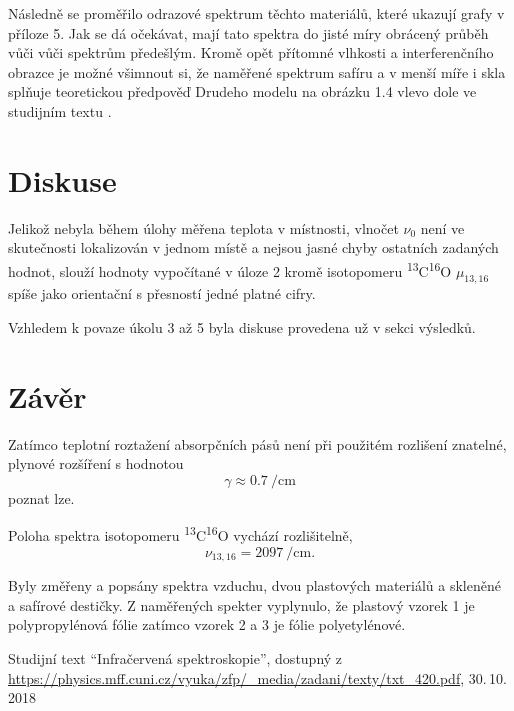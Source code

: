 \documentclass{protokol}
\begin{document}
      Následně se proměřilo odrazové spektrum těchto materiálů, které ukazují grafy v příloze 5. Jak se dá očekávat, mají tato spektra do jisté míry obrácený průběh vůči vůči spektrům předešlým. Kromě opět přítomné vlhkosti a interferenčního obrazce je možné všimnout si, že naměřené spektrum safíru a v menší míře i skla splňuje teoretickou předpověď Drudeho modelu na obrázku 1.4 vlevo dole ve studijním textu \cite{pokyny}.

  \section*{Diskuse}

    Jelikož nebyla během úlohy měřena teplota v místnosti, vlnočet $\nu_0$ není ve skutečnosti lokalizován v jednom místě a nejsou jasné chyby ostatních zadaných hodnot, slouží hodnoty vypočítané v úloze 2 kromě isotopomeru \textsuperscript{13}C\textsuperscript{16}O $ \mu_{13,16}$ spíše jako orientační s přesností jedné platné cifry. 

    Vzhledem k povaze úkolu 3 až 5 byla diskuse provedena už v sekci výsledků.

  \section*{Závěr}

    Zatímco teplotní roztažení absorpčních pásů není při použitém rozlišení znatelné, plynové rozšíření s hodnotou
    $$ \gamma \approx \SI{0.7}{\per\centi\metre} $$ 
    poznat lze.

    Poloha spektra isotopomeru \textsuperscript{13}C\textsuperscript{16}O vychází rozlišitelně,
    $$ \nu_{13,16} = \SI{2097}{\per\centi\metre}. $$ 

    Byly změřeny a popsány spektra vzduchu, dvou plastových materiálů a skleněné a safírové destičky. Z naměřených spekter vyplynulo, že plastový vzorek 1 je polypropylénová fólie zatímco vzorek 2 a 3 je fólie polyetylénové.



  \begin{thebibliography}{}
 
    Studijní text ``Infračervená spektroskopie'', dostupný z\\ \url{https://physics.mff.cuni.cz/vyuka/zfp/_media/zadani/texty/txt_420.pdf}, 30.\,10.\,2018
   
  \end{thebibliography}
\end{document}
